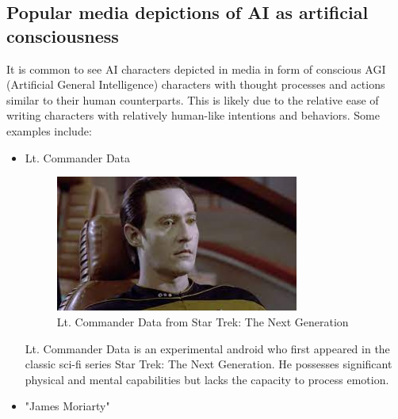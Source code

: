 \documentclass[masterthesis]{fer}
\begin{document}
\subsection{Popular media depictions of AI as artificial consciousness}
It is common to see AI characters depicted in media in form of conscious AGI (Artificial General Intelligence) characters with thought processes and actions similar to their human counterparts. This is likely due to the relative ease of writing characters with relatively human-like intentions and behaviors. Some examples include:

\begin{itemize}
\item Lt. Commander Data

\begin{figure}[!h]
\centering
\includegraphics[width=8cm]{Figures/DataTNG.jpeg}
\caption{Lt. Commander Data from Star Trek: The Next Generation}
\label{fig:DataTNG}
\end{figure}
Lt. Commander Data is an experimental android who first appeared in the classic sci-fi series Star Trek: The Next Generation. He possesses significant physical and mental capabilities but lacks the capacity to process emotion.

\item "James Moriarty"


\end{itemize}
\end{document}
